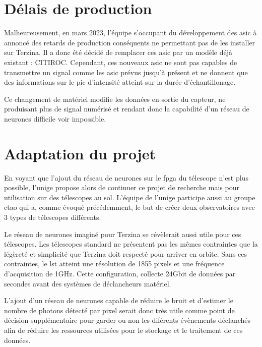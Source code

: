 \section{Délais de production}

Malheureusement, en mars 2023, l'équipe s'occupant du développement des \gls{asic} à annoncé des retards de production conséquents ne permettant pas de les installer sur Terzina.
Il a donc été décidé de remplacer ces \gls{asic} par un modèle déjà existant : CITIROC. Cependant, ces nouveaux \gls{asic} ne sont pas capables 
de transmettre un signal comme les \gls{asic} prévus jusqu'à présent et ne donnent que des informations sur le pic d'intensité atteint sur la durée d'échantillonage.


Ce changement de matériel modifie les données en sortie du capteur, ne produisant plus de signal numérisé et rendant donc la capabilité d'un réseau de neurones
difficile voir impossible.

\section{Adaptation du projet}

En voyant que l'ajout du réseau de neurones sur le \gls{fpga} du télescope n'est plus possible, l'\gls{unige} propose alors de continuer 
ce projet de recherche mais pour utilisation sur des télescopes au sol. L'équipe de l'\gls{unige} participe aussi au groupe \gls{ctao}
qui a, comme évoqué précédemment, le but de créer deux observatoires avec 3 types de télescopes différents.

Le réseau de neurones imaginé pour Terzina se révèlerait aussi utile pour ces télescopes.
Les télescopes standard ne présentent pas les mêmes contraintes que la légèreté et simplicité que Terzina doit respecté pour arriver en orbite.
Sans ces contraintes, le \gls{lst} atteint une résolution de 1855 pixels et une fréquence d'acquisition de 1GHz. 
Cette configuration, collecte 24Gbit de données par secondes avant des systèmes de déclancheurs matériel. \cite{LSTSpecifications}

L'ajout d'un réseau de neurones capable de réduire le bruit et d'estimer le nombre de photons détecté par pixel serait donc très utile comme point de décision supplémentaire
pour garder ou non les diférents évènements déclanchés afin de réduire les ressources utilisées pour le stockage et le traitement de ces données.

